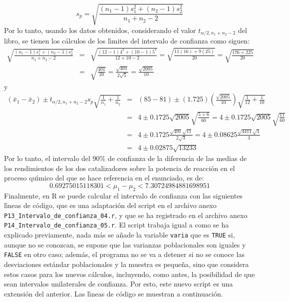 \begin{solucion}
\begin{equation*}
  s_p = \sqrt{\frac{(n_1-1)s_1^2 + (n_2-1)s_2^2}{n_1+n_2-2}}
 \end{equation*}
 Por lo tanto, usando los datos obtenidos, considerando el valor $t_{\alpha/2,n_1+n_2-2}$ del libro, se tienen los c\'alculos de los l\'{\i}mites del intervalo de confianza como siguen:
 \begin{eqnarray*}
  \sqrt{\frac{(n_1-1)s_1^2 + (n_2-1)s_2^2}{n_1+n_2-2}} & = & \sqrt{\frac{(12-1)4^2 + (10-1)5^2}{12+10-2}} = \sqrt{\frac{11(16)+9(25)}{20}} = \sqrt{\frac{176+225}{20}} \\
  & = & \sqrt{\frac{401}{20}} = \frac{\sqrt{401}}{2\sqrt{5}} = \frac{\sqrt{2005}}{10}
 \end{eqnarray*}
 y
 \begin{eqnarray*}
  \left( \bar{x}_1 - \bar{x}_2 \right) \pm t_{\alpha/2,n_1+n_2-2} s_p \sqrt{\frac{1}{n_1} + \frac{1}{n_2}} & = & (85-81) \pm (1.725)\left( \frac{\sqrt{2005}}{10} \right) \sqrt{\frac{1}{12} + \frac{1}{10}} \\
  & = & 4 \pm 0.1725\sqrt{2005}\sqrt{\frac{5+6}{60}} = 4 \pm 0.1725\sqrt{2005}\sqrt{\frac{11}{60}} \\
  & = & 4 \pm 0.1725\frac{\sqrt{401}\sqrt{11}}{2\sqrt{3}} = 4\pm 0.08625\frac{\sqrt{4411}\sqrt{3}}{3} \\ 
  & = & 4 \pm 0.02875\sqrt{13233}
 \end{eqnarray*}
 Por lo tanto, el intervalo del $90\%$ de confianza de la diferencia de las medias de los rendimientos de los dos catalizadores sobre la potencia de reacci\'on en el proceso qu\'{\i}mico del que se hace referencia en el enunciado, es de:
 \begin{equation*}
  0.69275015118301 < \mu_1 - \mu_2 < 7.30724984881698951
 \end{equation*}
 Finalmente, en R se puede calcular el intervalo de confianza con las siguientes l\'{\i}neas de c\'odigo, que es una adaptaci\'on del script en el archivo anexo \texttt{P13\_Intervalo\_de\_confianza\_04.r}, y que se ha registrado en el archivo anexo \texttt{P14\_Intervalo\_de\_confianza\_05.r}. El script trabaja igual a como se ha explicado previamente, nada m\'as se a\~nade la variable \texttt{varia} que es \texttt{TRUE} si, aunque no se conozcan, se supone que las varianzas poblacionales son iguales y \texttt{FALSE} en otro caso; adem\'as, el programa no se va a detener si no se conoce las desviaciones est\'andar poblacionales y la muestra es peque\~na, sino que considera estos casos para los nuevos c\'alculos, incluyendo, como antes, la posibilidad de que sean intervalos unilaterales de confianza. Por esto, este nuevo script es una extensi\'on del anterior. Las l\'{\i}neas de c\'odigo se muestran a continuaci\'on.

\end{solucion}
